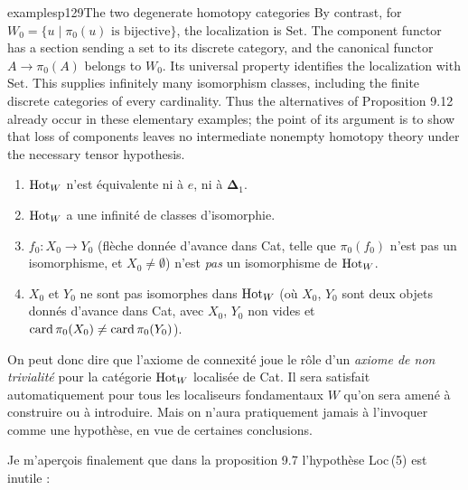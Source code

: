 \begin{dcomment}{examples}{p129}{The two degenerate homotopy categories}
By contrast, for $W_0=\{u\mid\pi_0(u)\text{ is bijective}\}$, the localization is $\mathrm{Set}$. The component functor has a section sending a set to its discrete category, and the canonical functor $A\longrightarrow\pi_0(A)$ belongs to $W_0$. Its universal property identifies the localization with $\mathrm{Set}$. This supplies infinitely many isomorphism classes, including the finite discrete categories of every cardinality. Thus the alternatives of Proposition 9.12 already occur in these elementary examples; the point of its argument is to show that loss of components leaves no intermediate nonempty homotopy theory under the necessary tensor hypothesis.
\end{dcomment}


\begin{enumerate}[leftmargin=*]
\item[\textit{a})] $\mathrm{Hot}_W$ n'est équivalente ni à $e$, ni à $\boldsymbol{\Delta}_1$.
\item[\textit{b})] $\mathrm{Hot}_W$ a une infinité de classes d'isomorphie.
\item[\textit{c})] $f_0:X_0\longrightarrow Y_0$ (flèche donnée d'avance dans Cat, telle que $\pi_0(f_0)$ n'est pas un isomorphisme, et $X_0\neq\emptyset$) n'est \textit{pas} un isomorphisme de $\mathrm{Hot}_W$.
\item[\textit{d})] $X_0$ et $Y_0$ ne sont pas isomorphes dans $\mathrm{Hot}_W$ (où $X_0$, $Y_0$ sont deux objets donnés d'avance dans Cat, avec $X_0$, $Y_0$ non vides et $\operatorname{card}\pi_0(X_0)\neq\operatorname{card}\pi_0(Y_0)$).
\end{enumerate}

\marginbar On peut donc dire que l'axiome de connexité joue le rôle d'un \textit{axiome de non trivialité} pour la catégorie $\mathrm{Hot}_W$ localisée de Cat. Il sera satisfait automatiquement pour tous les localiseurs fondamentaux $W$ qu'on sera amené à construire ou à introduire. Mais on n'aura pratiquement jamais à l'invoquer comme une hypothèse, en vue de certaines conclusions.

Je m'aperçois finalement que dans la proposition 9.7 l'hypothèse Loc\,(5) est inutile :


